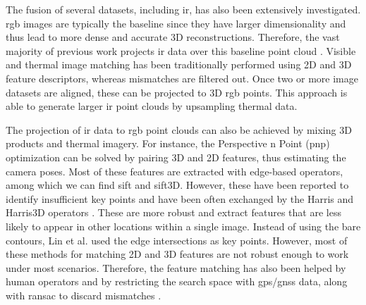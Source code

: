 The fusion of several datasets, including \acrshort{ir}, has also been extensively investigated. \acrshort{rgb} images are typically the baseline since they have larger dimensionality and thus lead to more dense and accurate 3D reconstructions. Therefore, the vast majority of previous work projects \acrshort{ir} data over this baseline point cloud  \cite{hosoi_estimating_2019}. Visible and thermal image matching has been traditionally performed using 2D and 3D feature descriptors, whereas mismatches are filtered out. Once two or more image datasets are aligned, these can be projected to 3D \acrshort{rgb} points. This approach is able to generate larger \acrshort{ir} point clouds by upsampling thermal data. 

The projection of \acrshort{ir} data to \acrshort{rgb} point clouds can also be achieved by mixing 3D products and thermal imagery. For instance, the Perspective n Point (\acrshort{pnp}) optimization can be solved by pairing 3D and 2D features, thus estimating the camera poses. Most of these features are extracted with edge-based operators, among which we can find \acrshort{sift} and \acrshort{sift}3D. However, these have been reported to identify insufficient key points and have been often exchanged by the Harris and Harris3D operators \cite{zhu_fusion_2021, zhu_direct_2019}. These are more robust and extract features that are less likely to appear in other locations within a single image. Instead of using the bare contours, Lin et al. \cite{lin_fusion_2019} used the edge intersections as key points. However, most of these methods for matching 2D and 3D features are not robust enough to work under most scenarios. Therefore, the feature matching has also been helped by human operators \cite{zhu_fusion_2021, zhu_direct_2019} and by restricting the search space with \acrshort{gps}/\acrshort{gnss} data, along with \acrshort{ransac} to discard mismatches \cite{lin_fusion_2019}. 

